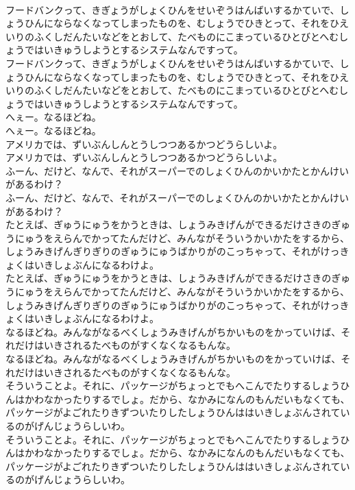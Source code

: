 \documentclass[8pt]{extreport}
\begin{document}
\begin{CJK}{UTF8}{min}
\\	フードバンクって、きぎょうがしょくひんをせいぞうはんばいするかていで、しょうひんにならなくなってしまったものを、むしょうでひきとって、それをひえいりのふくしだんたいなどをとおして、たべものにこまっているひとびとへむしょうではいきゅうしようとするシステムなんですって。	
\\	フードバンクって、きぎょうがしょくひんをせいぞうはんばいするかていで、しょうひんにならなくなってしまったものを、むしょうでひきとって、それをひえいりのふくしだんたいなどをとおして、たべものにこまっているひとびとへむしょうではいきゅうしようとするシステムなんですって。 
\\	へぇー。なるほどね。	
\\	へぇー。なるほどね。 
\\	アメリカでは、ずいぶんしんとうしつつあるかつどうらしいよ。	
\\	アメリカでは、ずいぶんしんとうしつつあるかつどうらしいよ。 
\\	ふーん、だけど、なんで、それがスーパーでのしょくひんのかいかたとかんけいがあるわけ？	
\\	ふーん、だけど、なんで、それがスーパーでのしょくひんのかいかたとかんけいがあるわけ？ 
\\	たとえば、ぎゅうにゅうをかうときは、しょうみきげんができるだけさきのぎゅうにゅうをえらんでかってたんだけど、みんながそういうかいかたをするから、しょうみきげんぎりぎりのぎゅうにゅうばかりがのこっちゃって、それがけっきょくはいきしょぶんになるわけよ。	
\\	たとえば、ぎゅうにゅうをかうときは、しょうみきげんができるだけさきのぎゅうにゅうをえらんでかってたんだけど、みんながそういうかいかたをするから、しょうみきげんぎりぎりのぎゅうにゅうばかりがのこっちゃって、それがけっきょくはいきしょぶんになるわけよ。 
\\	なるほどね。みんながなるべくしょうみきげんがちかいものをかっていけば、それだけはいきされるたべものがすくなくなるもんな。	
\\	なるほどね。みんながなるべくしょうみきげんがちかいものをかっていけば、それだけはいきされるたべものがすくなくなるもんな。 
\\	そういうことよ。それに、パッケージがちょっとでもへこんでたりするしょうひんはかわなかったりするでしょ。だから、なかみになんのもんだいもなくても、パッケージがよごれたりきずついたりしたしょうひんははいきしょぶんされているのがげんじょうらしいわ。	
\\	そういうことよ。それに、パッケージがちょっとでもへこんでたりするしょうひんはかわなかったりするでしょ。だから、なかみになんのもんだいもなくても、パッケージがよごれたりきずついたりしたしょうひんははいきしょぶんされているのがげんじょうらしいわ。 

\end{CJK}
\end{document}
